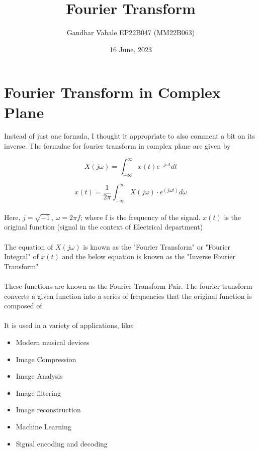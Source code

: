\documentclass{article}
\title{Fourier Transform}
\author{Gandhar Vabale EP22B047 (MM22B063)}
\date{16 June, 2023}
\begin{document}
\maketitle

\section*{Fourier Transform in Complex Plane}
Instead of just one formula, I thought it appropriate to also comment a bit on its inverse. The formulae for fourier transform in complex plane are given by

\[
X(j\omega) = \int_{-\infty}^{\infty} x(t) e^{-j\omega t} dt
\]

\[
x(t) = \frac{1}{2\pi} \int_{- \infty } ^ {\infty} X(j\omega) \cdot e^{(j\omega t)} d\omega
\]
\paragraph{}
Here, $j = \sqrt{-1}$, $\omega = 2\pi f$; where f is the frequency of the signal. $x(t)$ is the original function (signal in the context of Electrical department)

\paragraph{}
The equation of $X(j\omega)$ is known as the "Fourier Transform" or "Fourier Integral" of $x(t)$ and the below equation is known as the "Inverse Fourier Transform"

\paragraph{}
These functions are known as the Fourier Transform Pair. The fourier transform converts a given function into a series of frequencies that the original function is composed of.



\paragraph{}
It is used in a variety of applications, like:
\begin{itemize}

\item Modern musical devices
\item Image Compression
\item Image Analysis
\item Image filtering
\item Image reconstruction
\item Machine Learning
\item Signal encoding and decoding

\end{itemize}
\end{document}
